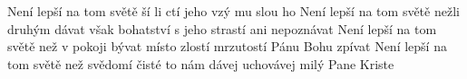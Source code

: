 \begin{TEXT}{Není lepší na tom světě}
\SLOKA {} ší   li  ctí \NL
jeho vzý mu slou ho  
\SLOKA Není lepší na tom světě nežli druhým dávat \NL
však bohatství s jeho strastí ani nepoznávat 
\SLOKA Není lepší na tom světě než v pokoji bývat \NL
místo zlostí mrzutostí Pánu Bohu zpívat 
\SLOKA Není lepší na tom světě než svědomí čisté \NL
to nám dávej uchovávej milý Pane Kriste \NL
\end{TEXT}
